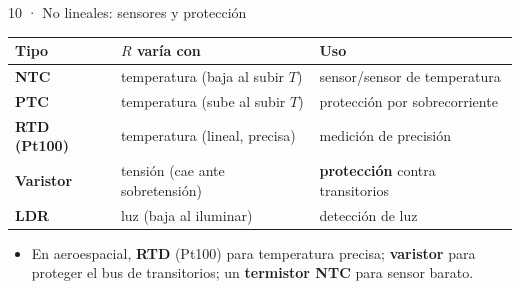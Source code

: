 \documentclass[aspectratio=169]{beamer}
\begin{document}
\begin{frame}{10 · No lineales: sensores y protección}
  \begin{table}
    \small
    \begin{tabular}{p{}p{}p{}}
      \toprule
      Tipo & $R$ varía con & Uso \\
      \midrule
      \textbf{NTC} & temperatura (baja al subir $T$) & sensor/sensor de temperatura \\
      \textbf{PTC} & temperatura (sube al subir $T$) & protección por sobrecorriente \\
      \textbf{RTD (Pt100)} & temperatura (lineal, precisa) & medición de precisión \\
      \textbf{Varistor} & tensión (cae ante sobretensión) & \textbf{protección} contra transitorios \\
      \textbf{LDR} & luz (baja al iluminar) & detección de luz \\
      \bottomrule
    \end{tabular}
  \end{table}
  \pause
  \begin{itemize}
    \item En aeroespacial, \textbf{RTD} (Pt100) para temperatura precisa; \textbf{varistor}
      para proteger el bus de transitorios; un \textbf{termistor NTC} para sensor barato.
  \end{itemize}
\end{frame}
\end{document}
